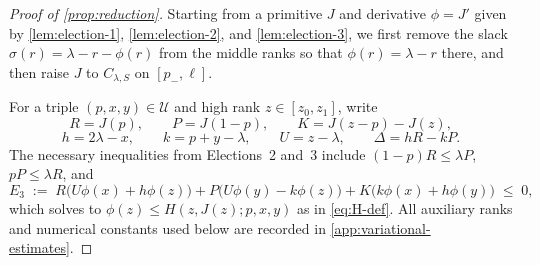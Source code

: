 \documentclass[11pt]{article}
\numberwithin{equation}{section}
\theoremstyle{plain}
\theoremstyle{definition}
\newcommand{\1}{\mathbf{1}}
\newcommand{\calU}{\mathcal{U}}
\begin{document}
\begin{proof}[Proof of {\cref{prop:reduction}}]
Starting from a primitive $J$ and derivative $\phi = J'$ given by \cref{lem:election-1}, \cref{lem:election-2}, and \cref{lem:election-3}, we first remove the slack $\sigma(r) = \lambda - r - \phi(r)$ from the middle ranks so that $\phi(r) = \lambda - r$ there, and then raise $J$ to $C_{\lambda, S}$ on $[p_-, \ell]$.

For a triple $(p, x, y) \in \calU$ and high rank $z \in [z_0, z_1]$, write
\[
  R = J(p), \qquad P = J(1 - p), \qquad K = J(z - p) - J(z),
\]
\[
  h = 2\lambda - x, \qquad k = p + y - \lambda, \qquad U = z - \lambda, \qquad \Delta = h R - k P.
\]
The necessary inequalities from Elections~2 and~3 include $(1 - p)R \le \lambda P$, $p P \le \lambda R$, and
\[
  E_3 \;:=\; R\bigl(U\phi(x) + h\phi(z)\bigr) + P\bigl(U\phi(y) - k\phi(z)\bigr) + K\bigl(k\phi(x) + h\phi(y)\bigr) \;\le\; 0,
\]
which solves to $\phi(z) \le H(z, J(z); p, x, y)$ as in \cref{eq:H-def}. All auxiliary ranks and numerical constants used below are recorded in \cref{app:variational-estimates}.


\end{proof}
\end{document}
